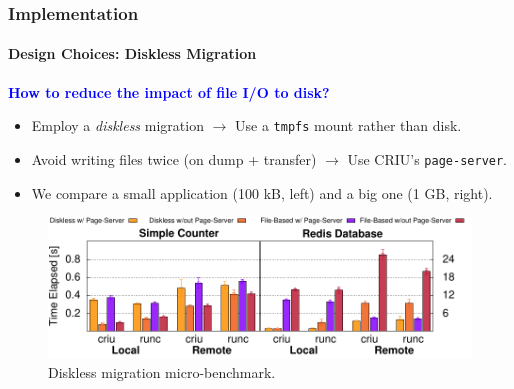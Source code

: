 \documentclass[9pt,    %
    english,            %
    xcolor=table,       %
    envcountsect,        %
    aspectratio=169     %
]{beamer}
\begin{document}
\begin{frame}
    \frametitle{Implementation}
    \framesubtitle{Design Choices: Diskless Migration}

    \vspace{10pt}

    \textbf{\textcolor{blue}{How to reduce the impact of file I/O to disk?}}
    \begin{itemize}
        \item Employ a \emph{diskless} migration $\rightarrow$ Use a \texttt{tmpfs} mount rather than disk.
        \item Avoid writing files twice (on dump + transfer) $\rightarrow$ Use CRIU's \texttt{page-server}. 
        \item We compare a small application (100 kB, left) and a big one (1 GB, right).
    \end{itemize}

    \vspace{-5pt}

    \begin{figure}
        \centering
        \includegraphics[width=.75\textwidth]{./figs/diskless_migration_microbenchmark.pdf}
        \caption{Diskless migration micro-benchmark.\label{fig:diskless-microbecnhmark}}
    \end{figure}
    
\end{frame}
\end{document}
